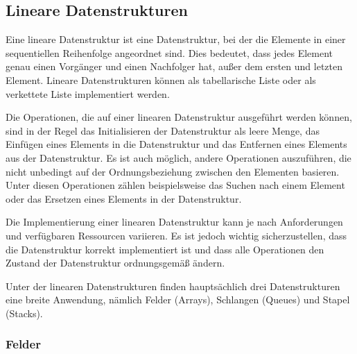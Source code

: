 \subsection{Lineare Datenstrukturen}
Eine lineare Datenstruktur ist eine Datenstruktur, bei der die Elemente in einer sequentiellen Reihenfolge angeordnet sind. Dies bedeutet, dass jedes Element genau einen Vorgänger und einen Nachfolger hat, außer dem ersten und letzten Element. Lineare Datenstrukturen können als tabellarische Liste oder als verkettete Liste implementiert werden. \autocite[314-315]{hoffmann_einfuhrung_2011}

Die Operationen, die auf einer linearen Datenstruktur ausgeführt werden können, sind in der Regel das Initialisieren der Datenstruktur als leere Menge, das Einfügen eines Elements in die Datenstruktur und das Entfernen eines Elements aus der Datenstruktur. Es ist auch möglich, andere Operationen auszuführen, die nicht unbedingt auf der Ordnungsbeziehung zwischen den Elementen basieren. Unter diesen Operationen zählen beispielsweise das Suchen nach einem Element oder das Ersetzen eines Elements in der Datenstruktur. \autocite[314-315]{hoffmann_einfuhrung_2011}

Die Implementierung einer linearen Datenstruktur kann je nach Anforderungen und verfügbaren Ressourcen variieren. Es ist jedoch wichtig sicherzustellen, dass die Datenstruktur korrekt implementiert ist und dass alle Operationen den Zustand der Datenstruktur ordnungsgemäß ändern. \autocite[314-315]{hoffmann_einfuhrung_2011}

Unter der linearen Datenstrukturen finden hauptsächlich drei Datenstrukturen eine breite Anwendung, nämlich Felder (Arrays), Schlangen (Queues) und Stapel (Stacks).

\subsubsection{Felder}

